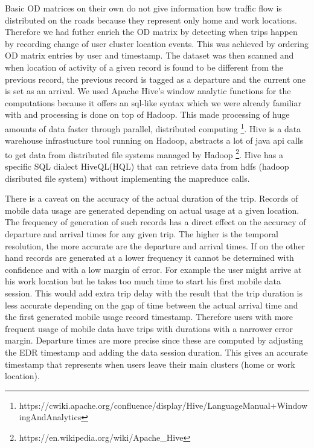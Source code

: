 \documentclass[12pt, a4paper]{report}
\theoremstyle{definition}
\theoremstyle{definition}%
\theoremstyle{definition}%
\theoremstyle{definition}%
\theoremstyle{definition}%
\theoremstyle{definition}%
\begin{document}
Basic OD matrices on their own do not give information how traffic flow is distributed on the roads because they represent only home and work locations. Therefore we had futher enrich the OD matrix by detecting when trips happen by recording change of user cluster location events. This was achieved by ordering OD matrix entries by user and timestamp. The dataset was then scanned and when location of activity of a given record is found to be different from the previous record, the previous record is tagged as a departure and the current one is set as an arrival. We used Apache Hive's window analytic functions for the computations because it offers an sql-like syntax which we were already familiar with and processing is done on top of Hadoop. This made processing of huge amounts of data faster through parallel, distributed computing  \footnote{https://cwiki.apache.org/confluence/display/Hive/LanguageManual+WindowingAndAnalytics}. Hive is a data warehouse infrastucture tool running on Hadoop, abstracts a lot of java api calls to get data from distributed file systems managed by Hadoop \footnote{https://en.wikipedia.org/wiki/Apache\_Hive}. Hive has a specific SQL dialect HiveQL(HQL) that can retrieve data from hdfs (hadoop disributed file system) without implementing the mapreduce calls.


There is a caveat on the accuracy of the actual duration of the trip. Records of mobile data usage are generated depending on actual usage at a given location. The frequency of generation of such records has a direct effect on the accuracy of departure and arrival times for any given trip. The higher is the temporal resolution, the more accurate are the departure and arrival times. If on the other hand records are generated at a lower frequency it cannot be determined with confidence and with a low margin of error. For example the user might arrive at his work location but he takes too much time to start his first mobile data session. This would add extra trip delay with the result that the trip duration is less accurate depending on the gap of time between the actual arrival time and the first generated mobile usage record timestamp. Therefore users with more frequent usage of mobile data have trips with durations with a narrower error margin. Departure times are more precise since these are computed by adjusting the EDR timestamp and adding the data session duration. This gives an accurate timestamp that represents when users leave their main clusters (home or work location).   
\end{document}
